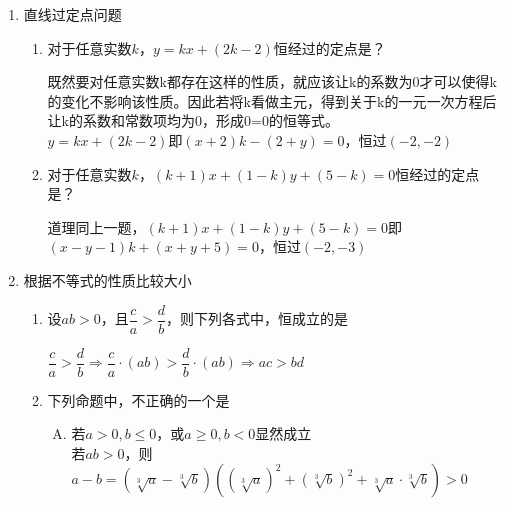 \begin{enumerate}
\begin{enumerate}
\begin{jieda}
\begin{enumerate}
            \end{enumerate}
            综上$a \in \left\{1, -1, -4, \dfrac{5}{2}\right\}$
        \end{jieda} 
    \end{enumerate}
    \item 直线过定点问题
    \begin{enumerate}
        \item 对于任意实数$k$，$y = kx+(2k-2)$恒经过的定点是？
        \begin{jieda}
            既然要对任意实数k都存在这样的性质，就应该让k的系数为0才可以使得k的变化不影响该性质。因此若将k看做主元，得到关于k的一元一次方程后让k的系数和常数项均为0，形成0=0的恒等式。 \\
            $y = kx+(2k-2)$即$(x+2)k-(2+y) = 0$，恒过$(-2, -2)$
        \end{jieda}
        \item 对于任意实数$k$，$(k+1)x + (1-k)y + (5-k) = 0$恒经过的定点是？
        \begin{jieda}
            道理同上一题，$(k+1)x + (1-k)y + (5-k) = 0$即$(x-y-1)k+(x+y+5) = 0$，恒过$(-2, -3)$
        \end{jieda}
    \end{enumerate}
    \item 根据不等式的性质比较大小
    \begin{enumerate}
        \item 设$ab>0$，且$\dfrac{c}{a} > \dfrac{d}{b}$，则下列各式中，恒成立的是
        \begin{jieda}
            $\dfrac{c}{a} > \dfrac{d}{b} \Longrightarrow \dfrac{c}{a} \cdot (ab) > \dfrac{d}{b}  \cdot (ab) \Longrightarrow ac > bd$
        \end{jieda}
        \item 下列命题中，不正确的一个是
        \begin{jieda}
            \begin{enumerate}[A.]
                \item 若$a > 0, b \leq 0$，或$a \geq 0, b < 0$显然成立\\
                若$ab > 0$，则$a - b = (\sqrt[3]{a} - \sqrt[3]{b})((\sqrt[3]{a})^2 + (\sqrt[3]{b})^2 + \sqrt[3]{a} \cdot \sqrt[3]{b}) > 0$ 
                

\end{enumerate}
\end{jieda}
\end{enumerate}
\end{enumerate}
